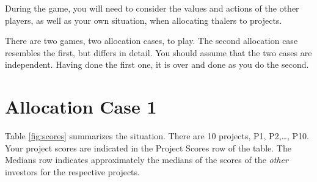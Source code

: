 \documentclass[11pt, oneside]{article}   	%
\begin{document}
During the game, you will need to consider the values and actions of the other players, as well as your own situation, when allocating thalers to projects.


There are two games, two allocation cases, to play. The second allocation case resembles the first, but differs in detail. You should assume that the two cases are independent. Having done the first one, it is over and done as you do the second. 

\newpage
\section{Allocation Case 1}

Table \ref{fig:scores} summarizes the situation. There are 10 projects, P1, P2,\ldots , P10.
Your project scores are indicated in the Project Scores row of the table. The Medians row indicates approximately the medians of the scores of the \emph{other} investors for the respective projects.

\end{document}
